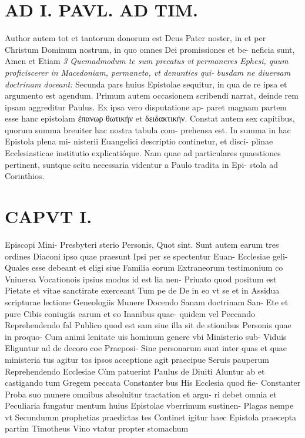 \documentclass{article}
\begin{document}
\begin{pages}
\section*{AD I. PAVL. AD TIM. }
\marginpar{[ p.6 ]}Author autem tot et tantorum donorum est Deus Pater noster, in et per Christum Dominum nostrum, in quo omnes Dei promissiones et be- neficia sunt, Amen et Etiam \textit{3} \textit{Quemadmodum te sum precatus vt} \textit{permaneres Ephesi, quum proficiscerer in} \textit{Macedoniam, permaneto, vt denunties qui-} \textit{busdam ne diuersam doctrinam doceant:} Secunda pars huius Epistolae sequitur, in qua de re ipsa et argumento est agendum. Primum autem occasionem scribendi narrat, deinde rem ipsam aggreditur Paulus. Ex ipsa vero disputatione ap- paret magnam partem esse hanc epistolam ἐπανωρ θωτικήν et δειδακτικήν. Constat autem sex capitibus, quorum summa breuiter hac nostra tabula com- prehensa est. In summa in hac Epistola plena mi- nisterii Euangelici descriptio continetur, et disci- plinae Ecclesiasticae institutio explicatióque. Nam quae ad particulares quaestiones pertinent, suntque scitu necessaria videntur a Paulo tradita in Epi- stola ad Corinthios. 
\section*{CAPVT  I. }
\marginpar{[ p.7 ]}Episcopi Mini- Presbyteri sterio Personis, Quot sint. Sunt autem earum tres ordines { Diaconi ipso quae praesunt Ipsi per se spectentur Euan- Ecclesiae { geli- Quales esse debeant et eligi siue Familia eorum Extraneorum testimonium co Vniuersa { Vocationois ipsius modus id est lia nen- Priuato quod positum est { Pietate et vitae sanctirate exerceant Tum pe de De in eo vt se et in Assidua scripturae lectione { Geneologiis Munere Docendo Sanam doctrinam San- Ete et pure Cibis coniugiis earum et eo Inanibus quae- quidem vel Peccando Reprehendendo fal { Publico quod est { sam siue illa sit de { stionibus Personis quae { in proquo- Cum animi lenitate uis hominum genere vbi Ministerio sub- Viduis Eliguntur ad de decoro coe Praeposi- Sine personarum sunt inter quas et quae ministeria tus agitur tos ipsos acceptione agit praecipue Seruis pauperum { { Reprehendendo Ecclesiae Cùm patuerint Paulus de Diuiti { Aluntur ab et castigando tum Gregem peccata { Constanter bus His Ecclesia { quod fie- Constanter Proba suo munere omnibus absoluitur tractation et argu- ri debet omnia et Peculiaria { fungatur { mentum huius Epistolae vberrimum sustinen- Plagas nempe vt { Secundumm prophetias praedictas tes Continet igitur haec Epistola praecepta partim Timotheus { Vino vtatur propter stomachum { 
}}}}}}}}}}}}}}}}}}}
\end{pages}
\end{document}
